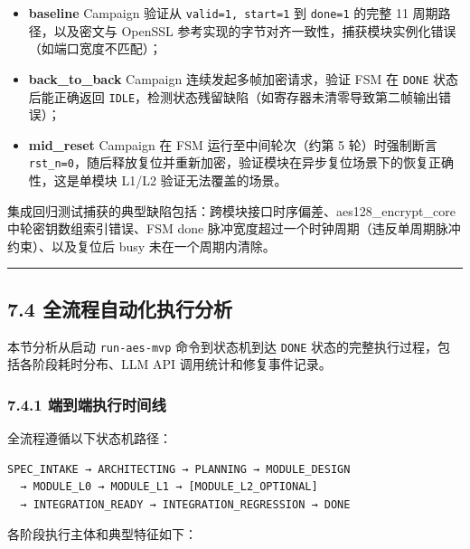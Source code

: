 \begin{itemize}
\tightlist
\item
  \textbf{baseline} Campaign 验证从 \texttt{valid=1,\ start=1} 到
  \texttt{done=1} 的完整 11 周期路径，以及密文与 OpenSSL
  参考实现的字节对齐一致性，捕获模块实例化错误（如端口宽度不匹配）；
\item
  \textbf{back\_to\_back} Campaign 连续发起多帧加密请求，验证 FSM 在
  \texttt{DONE} 状态后能正确返回
  \texttt{IDLE}，检测状态残留缺陷（如寄存器未清零导致第二帧输出错误）；
\item
  \textbf{mid\_reset} Campaign 在 FSM 运行至中间轮次（约第 5
  轮）时强制断言
  \texttt{rst\_n=0}，随后释放复位并重新加密，验证模块在异步复位场景下的恢复正确性，这是单模块
  L1/L2 验证无法覆盖的场景。
\end{itemize}

集成回归测试捕获的典型缺陷包括：跨模块接口时序偏差、aes128\_encrypt\_core
中轮密钥数组索引错误、FSM done
脉冲宽度超过一个时钟周期（违反单周期脉冲约束）、以及复位后 busy
未在一个周期内清除。

\begin{center}\rule{0.5\linewidth}{0.5pt}\end{center}

\subsection{7.4
全流程自动化执行分析}\label{ux5168ux6d41ux7a0bux81eaux52a8ux5316ux6267ux884cux5206ux6790}

本节分析从启动 \texttt{run-aes-mvp} 命令到状态机到达 \texttt{DONE}
状态的完整执行过程，包括各阶段耗时分布、LLM API 调用统计和修复事件记录。

\subsubsection{7.4.1
端到端执行时间线}\label{ux7aefux5230ux7aefux6267ux884cux65f6ux95f4ux7ebf}

全流程遵循以下状态机路径：

\begin{verbatim}
SPEC_INTAKE → ARCHITECTING → PLANNING → MODULE_DESIGN
  → MODULE_L0 → MODULE_L1 → [MODULE_L2_OPTIONAL]
  → INTEGRATION_READY → INTEGRATION_REGRESSION → DONE
\end{verbatim}

各阶段执行主体和典型特征如下：

